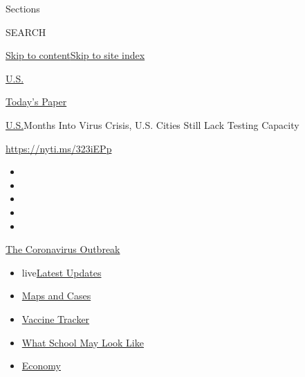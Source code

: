 Sections

SEARCH

\protect\hyperlink{site-content}{Skip to
content}\protect\hyperlink{site-index}{Skip to site index}

\href{https://www.nytimes.com/section/us}{U.S.}

\href{https://myaccount.nytimes.com/auth/login?response_type=cookie\&client_id=vi}{}

\href{https://www.nytimes.com/section/todayspaper}{Today's Paper}

\href{/section/us}{U.S.}\textbar{}Months Into Virus Crisis, U.S. Cities
Still Lack Testing Capacity

\url{https://nyti.ms/323iEPp}

\begin{itemize}
\item
\item
\item
\item
\item
\end{itemize}

\href{https://www.nytimes.com/news-event/coronavirus?action=click\&pgtype=Article\&state=default\&region=TOP_BANNER\&context=storylines_menu}{The
Coronavirus Outbreak}

\begin{itemize}
\tightlist
\item
  live\href{https://www.nytimes.com/2020/08/01/world/coronavirus-covid-19.html?action=click\&pgtype=Article\&state=default\&region=TOP_BANNER\&context=storylines_menu}{Latest
  Updates}
\item
  \href{https://www.nytimes.com/interactive/2020/us/coronavirus-us-cases.html?action=click\&pgtype=Article\&state=default\&region=TOP_BANNER\&context=storylines_menu}{Maps
  and Cases}
\item
  \href{https://www.nytimes.com/interactive/2020/science/coronavirus-vaccine-tracker.html?action=click\&pgtype=Article\&state=default\&region=TOP_BANNER\&context=storylines_menu}{Vaccine
  Tracker}
\item
  \href{https://www.nytimes.com/interactive/2020/07/29/us/schools-reopening-coronavirus.html?action=click\&pgtype=Article\&state=default\&region=TOP_BANNER\&context=storylines_menu}{What
  School May Look Like}
\item
  \href{https://www.nytimes.com/live/2020/07/31/business/stock-market-today-coronavirus?action=click\&pgtype=Article\&state=default\&region=TOP_BANNER\&context=storylines_menu}{Economy}
\end{itemize}

